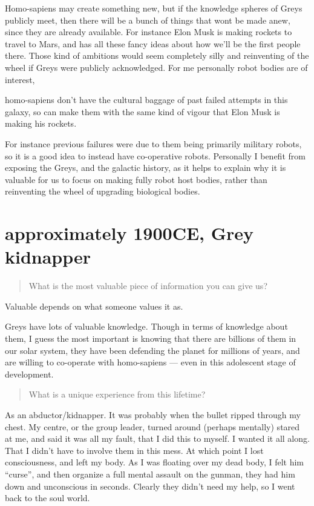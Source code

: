 Homo-sapiens may create something new, but if the knowledge spheres of Greys
publicly meet, then there will be a bunch of things that wont be made anew,
since they are already available. For instance Elon Musk is making rockets to
travel to Mars, and has all these fancy ideas about how we'll be the first
people there. Those kind of ambitions would seem completely silly and
reinventing of the wheel if Greys were publicly acknowledged. For me personally
robot bodies are of interest,

homo-sapiens don't have the cultural baggage of past failed attempts in this
galaxy, so can make them with the same kind of vigour that Elon Musk is making
his rockets.

For instance previous failures were due to them being primarily military robots,
so it is a good idea to instead have co-operative robots. Personally I benefit
from exposing the Greys, and the galactic history, as it helps to explain why it
is valuable for us to focus on making fully robot host bodies, rather than
reinventing the wheel of upgrading biological bodies.


\chapter{approximately 1900CE, Grey kidnapper}

\blockquote{What is the most valuable piece of information you can give us?}

Valuable depends on what someone values it as.

Greys have lots of valuable knowledge. Though in terms of knowledge about them,
I guess the most important is knowing that there are billions of them in our
solar system, they have been defending the planet for millions of years, and are
willing to co-operate with homo-sapiens --- even in this adolescent stage of
development.


\blockquote{What is a unique experience from this lifetime?}

As an abductor/kidnapper. It was probably when the bullet ripped through my
chest. My centre, or the group leader, turned around (perhaps mentally) stared
at me, and said it was all my fault, that I did this to myself. I wanted it all
along. That I didn't have to involve them in this mess. At which point I lost
consciousness, and left my body. As I was floating over my dead body, I felt him
``curse'', and then organize a full mental assault on the gunman, they had him
down and unconscious in seconds. Clearly they didn't need my help, so I went
back to the soul world.

